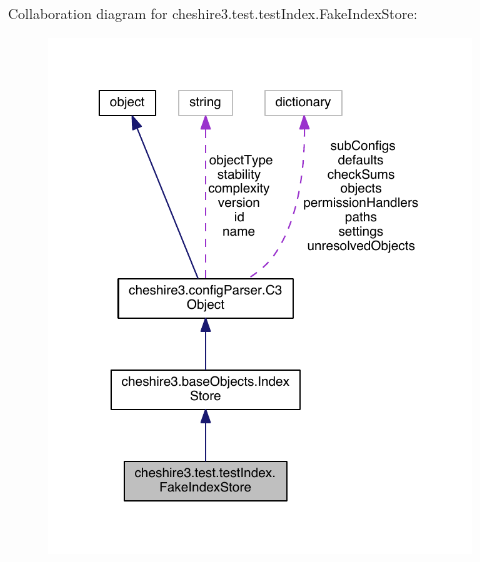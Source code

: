 Collaboration diagram for cheshire3.\-test.\-test\-Index.\-Fake\-Index\-Store\-:
\nopagebreak
\begin{figure}[H]
\begin{center}
\leavevmode
\includegraphics[width=325pt]{classcheshire3_1_1test_1_1test_index_1_1_fake_index_store__coll__graph}
\end{center}
\end{figure}
